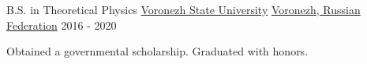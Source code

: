 
\begin{cventries}

	\cventry
	{B.S. in Theoretical Physics}
	{\href{https://www.linkedin.com/school/\%D0\%B2\%D0\%BE\%D1\%80\%D0\%BE\%D0\%BD\%D0\%B5\%D0\%B6\%D1\%81\%D0\%BA\%D0\%B8\%D0\%B9-\%D0\%B3\%D0\%BE\%D1\%81\%D1\%83\%D0\%B4\%D0\%B0\%D1\%80\%D1\%81\%D1\%82\%D0\%B2\%D0\%B5\%D0\%BD\%D0\%BD\%D1\%8B\%D0\%B9-\%D1\%83\%D0\%BD\%D0\%B8\%D0\%B2\%D0\%B5\%D1\%80\%D1\%81\%D0\%B8\%D1\%82\%D0\%B5\%D1\%82}{Voronezh State University}}
	{\href{https://www.google.com/maps/place/Voronezh,+Voronezh+Oblast,+Russia}{Voronezh, Russian Federation}}
	{2016 - 2020}
	{
		\begin{cvitems}
			\item {Obtained a governmental scholarship. Graduated with honors.}
		\end{cvitems}
	}

\end{cventries}
